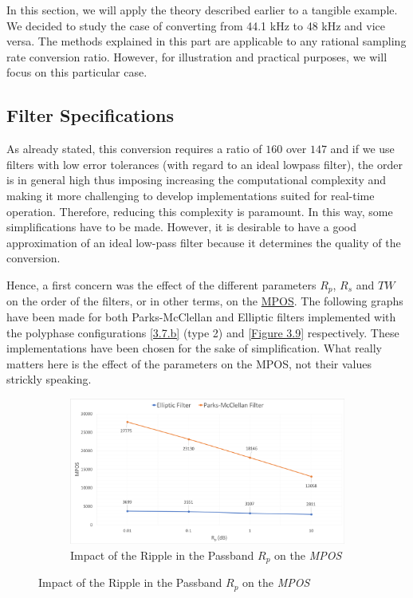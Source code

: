 In this section, we will apply the theory described earlier to a tangible example. We decided to study the case of converting from 44.1 kHz to 48 kHz and vice versa. The methods explained in this part are applicable to any rational sampling rate conversion ratio. However, for illustration and practical purposes, we will focus on this particular case.

\subsection{Filter Specifications}\label{section 3.2.1}
As already stated, this conversion requires a ratio of $160$ over $147$ and if we use filters with low error tolerances (with regard to an ideal lowpass filter), the order is in general high thus imposing increasing the computational complexity and making it more challenging to develop implementations suited for real-time operation. Therefore, reducing this complexity is paramount. In this way, some simplifications have to be made. However, it is desirable to have a good approximation of an ideal low-pass filter because it determines the quality of the conversion. 


Hence, a first concern was the effect of the different parameters $R_p$, $R_s$ and $TW$ on the order of the filters, or in other terms, on the \hyperlink{MPOS}{MPOS}. The following graphs have been made for both Parks-McClellan and Elliptic filters implemented with the polyphase configurations \ref{3.7.b} (type 2) and \ref{Figure 3.9} respectively. These implementations have been chosen for the sake of simplification. What really matters here is the effect of the parameters on the  MPOS, not their values strickly speaking.


\begin{figure}[ht!]
	\centering
	\begin{subfigure}[htb]{\textwidth}
		\centering 
		\includegraphics[scale=0.275]{effect_Rp.png}
		\caption{Impact of the Ripple in the Passband $R_p$ on the \textit{MPOS}}\label{3.21.a}
	\end{subfigure}
\end{figure}

